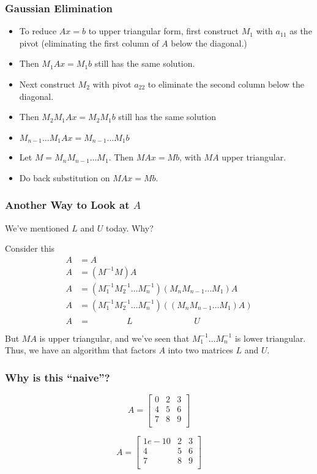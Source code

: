 \documentclass[10pt]{beamer}
\begin{document}
\begin{frame}
\frametitle{Gaussian Elimination}
\begin{itemize}
  \item To reduce $Ax=b$ to upper triangular form, first construct $M_1$ with
$a_{11}$ as the pivot (eliminating the first column of $A$ below the diagonal.)
  \item Then $M_1 A x = M_1 b$ still has the same solution.\
  \item Next construct $M_2$ with pivot $a_{22}$ to eliminate the second column
below the diagonal.
  \item Then $M_2 M_1 A x = M_2 M_1 b$ still has the same solution
  \item $M_{n-1} \dots M_1 A x = M_{n-1}\dots M_1 b$
  \item Let $M = M_{n}M_{n-1}\dots M_1$.  Then $M A x = M b$, with $MA$ upper triangular. 
  \item Do back substitution on $M A x = M b$.
\end{itemize}
\end{frame}

\begin{frame}
\frametitle{Another Way to Look at $A$}
We've mentioned $L$ and $U$ today.  Why?

Consider this
\begin{align*}
 A & = A\\
 A & = (M^{-1}M) A\\
 A & = (M_1^{-1}M_2^{-1}\dots M_n^{-1})(M_n M_{n-1} \dots M_1)A\\
 A & = (M_1^{-1}M_2^{-1}\dots M_n^{-1}) ((M_n M_{n-1} \dots M_1)A)\\
 A & = \phantom{(M_1^{-1}M_2^{-1}} L \phantom{M_n^{-1}) ((M_n M_{n-1}} U \phantom{M_1)A)}\\
\end{align*}
But $MA$ is upper triangular, and we've seen that $M_1^{-1}\dots M_n^{-1}$ is 
lower triangular.  Thus, we have an algorithm that factors $A$ into two 
matrices $L$ and $U$.
\end{frame}

\begin{frame}
\frametitle{Why is this ``naive''?}
\begin{example}
\begin{equation*}
A=
\begin{bmatrix}
  0 & 2 & 3\\
  4 & 5 & 6\\
  7 & 8 & 9\\
\end{bmatrix}
\end{equation*}
\end{example}
\begin{example}
\begin{equation*}
A=
\begin{bmatrix}
  1e-10 & 2 & 3\\
  4 & 5 & 6\\
  7 & 8 & 9\\
\end{bmatrix}
\end{equation*}
\end{example}

\end{frame}
\end{document}
